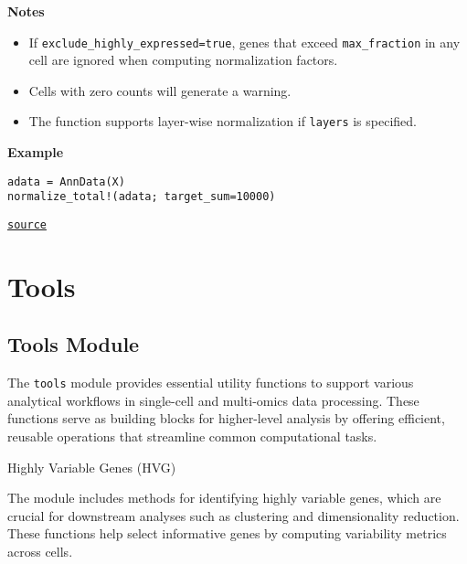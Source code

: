 \documentclass[oneside]{memoir}
\begin{document}
\begin{adjustwidth}{2em}{0pt}
\begin{itemize}
\end{itemize}
\textbf{Notes}

\begin{itemize}
\item If \texttt{exclude\_highly\_expressed=true}, genes that exceed \texttt{max\_fraction} in any cell are ignored when computing normalization factors.


\item Cells with zero counts will generate a warning.


\item The function supports layer-wise normalization if \texttt{layers} is specified.

\end{itemize}
\textbf{Example}


\begin{verbatim}
adata = AnnData(X)
normalize_total!(adata; target_sum=10000)
\end{verbatim}



\href{https://github.com/zehua0417/Juscan.jl/blob/393ad1b827b678ea98a738f92af658ee9ed9a403/src/preprocessing/normalization.jl#L172-L207}{\texttt{source}}


\end{adjustwidth}

\chapter{Tools}


\section{Tools Module}



\label{3310625921133914793}{}


The \texttt{tools} module provides essential utility functions to support various analytical workflows in single-cell and multi-omics data processing. These functions serve as building blocks for higher-level analysis by offering efficient, reusable operations that streamline common computational tasks.



Highly Variable Genes (HVG)



The module includes methods for identifying highly variable genes, which are crucial for downstream analyses such as clustering and dimensionality reduction. These functions help select informative genes by computing variability metrics across cells.
\end{document}

